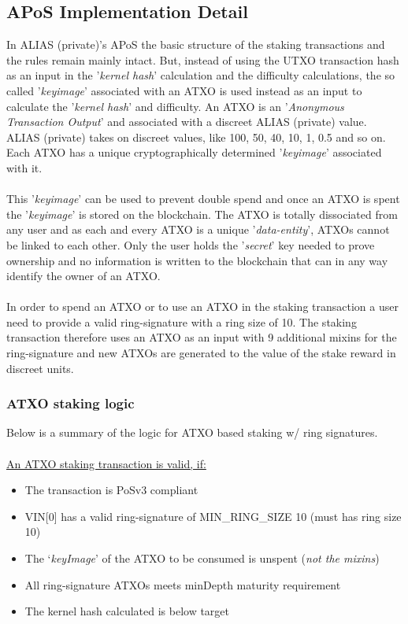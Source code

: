\subsection{APoS Implementation Detail}
In ALIAS (private)'s APoS the basic structure of the staking transactions and
the rules remain mainly intact. But, instead of using the UTXO transaction
hash as an input in the '\textit{kernel hash}' calculation and the
difficulty calculations, the so called '\textit{keyimage}' associated with
an ATXO is used instead as an input to calculate the '\textit{kernel hash}'
and difficulty. An ATXO is an '\textit{Anonymous Transaction Output}' and
associated with a discreet ALIAS (private) value. ALIAS (private) takes on discreet values,
like 100, 50, 40, 10, 1, 0.5 and so on. Each ATXO has a unique
cryptographically determined '\textit{keyimage}' associated with it.
\\
\\
\noindent
This '\textit{keyimage}' can be used to prevent double spend and once an
ATXO is spent the '\textit{keyimage}' is stored on the blockchain. The ATXO
is totally dissociated from any user and as each and every ATXO is a unique
'\textit{data-entity}', ATXOs cannot be linked to each other. Only the user
holds the '\textit{secret}' key needed to prove ownership and no information
is written to the blockchain that can in any way identify the owner of an
ATXO.
\\
\\
\noindent
In order to spend an ATXO or to use an ATXO in the staking transaction a user
need to provide a valid ring-signature with a ring size of 10. The staking
transaction therefore uses an ATXO as an input with 9 additional mixins for
the ring-signature and new ATXOs are generated to the value of the stake
reward in discreet units.



\subsubsection{ATXO staking logic}
Below is a summary of the logic for ATXO based staking w/ ring signatures.
\\
\\
\noindent
\underline{An ATXO staking transaction is valid, if:}
\begin{itemize}
	\item The transaction is PoSv3 compliant
	\item VIN[0] has a valid ring-signature of MIN\_RING\_SIZE 10 (must has ring size 10)
	\item The ‘\textit{keyImage}’ of the ATXO to be consumed is unspent (\textit{not the mixins})
	\item All ring-signature ATXOs meets minDepth maturity requirement
	\item The kernel hash calculated is below target
\end{itemize}
\newpage



